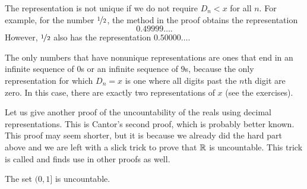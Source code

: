 The representation is not unique if we do not require
$D_n < x$ for all $n$.
For example, for the
number $\nicefrac{1}{2}$, the method in the proof obtains the representation
\begin{equation*}
0.49999\ldots .
\end{equation*}
However, $\nicefrac{1}{2}$ also has the representation $0.50000\ldots$.

The only numbers that have nonunique
representations are ones that end in an infinite sequence of $0$s
or an infinite sequence of $9$s, because the only representation for which
$D_n = x$ is one where all digits past the $n$th digit are zero.
In this case,
there are exactly two representations of $x$ (see the exercises).

Let us give another proof of the uncountability of the reals using decimal
representations.
This is Cantor's second proof, which is probably better known.
This proof may seem shorter, but it is because we already did
the hard part above and we are left with a slick trick to prove that ${\mathbb{R}}$ is
uncountable.  This trick is called
\emph{} and
finds use in other proofs as well.

\begin{thm}[Cantor]
The set $(0,1]$ is uncountable.
\end{thm}


